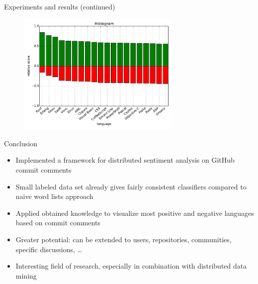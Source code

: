 \documentclass[t,11pt]{beamer}
\begin{document}
\begin{frame}[fragile]{Experiments and results (continued)}
  \begin{figure}
    \centering
    \includegraphics[width=0.7\textwidth]{../plots/all-group-pos.pdf}
  \end{figure}
\end{frame}

\begin{frame}[fragile]{Conclusion}
\begin{itemize}
  \item Implemented a framework for distributed sentiment analysis on GitHub 
    commit comments
  \item Small labeled data set already gives fairly consistent classifiers 
    compared to naive word lists approach
  \item Applied obtained knowledge to visualize most positive and negative 
    languages based on commit comments
  \item Greater potential: can be extended to users, repositories, communities, 
    specific discussions, \ldots
  \item Interesting field of research, especially in combination with 
    distributed data mining
\end{itemize}
\end{frame}
\end{document}
